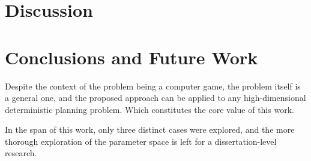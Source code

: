 \documentclass[11pt, a4paper]{article}
\begin{document}
	\section{Discussion}

	\section{Conclusions and Future Work}

	Despite the context of the problem being a computer game, the problem itself is a general one, and the proposed approach can be applied to any high-dimensional deterministic planning problem.
	Which constitutes the core value of this work.

	In the span of this work, only three distinct cases were explored, and the more thorough exploration of the parameter space is left for a dissertation-level research.

	\printbibliography
\end{document}
